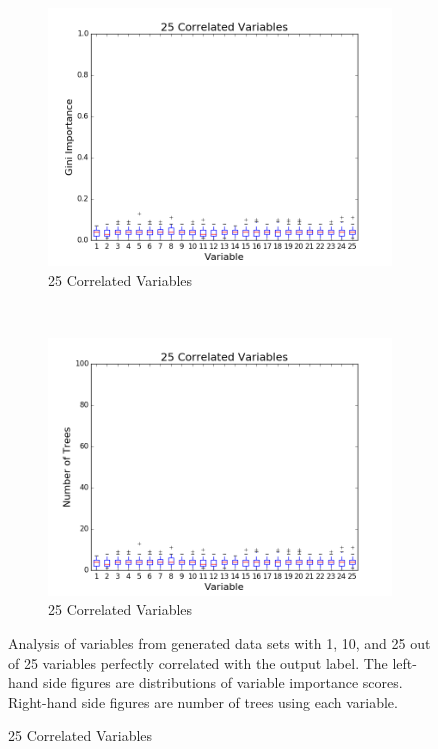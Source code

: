 \begin{figure}[H]
\begin{subfigure}[b]{0.45\textwidth}
    \includegraphics[width=\textwidth]{figures/random_forests/rf_correlated_1_0_25.png}
    \caption{25 Correlated Variables}
    \label{fig:corr-1-25}
  \end{subfigure}
  ~
  \begin{subfigure}[b]{0.45\textwidth}
    \includegraphics[width=\textwidth]{figures/random_forests/rf_correlated_1_0_25_feature_counts.png}
    \caption{25 Correlated Variables}
    \label{fig:corr-1-25-counts}
  \end{subfigure}
  
  Analysis of variables from generated data sets with 1, 10, and 25 out of 25 variables perfectly correlated with the output label. The left-hand side figures are distributions of variable importance scores. Right-hand side figures are number of trees using each variable.
  \label{fig:corr-1}
\end{figure}

